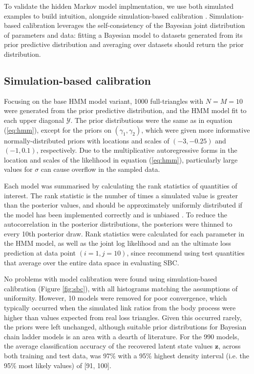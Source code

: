To validate the hidden Markov model implmentation, 
we use both simulated examples
to build intuition, alongside
simulation-based calibration \citep{talts2018,modrak2023}.
Simulation-based calibration leverages the self-consistency
of the Bayesian joint distribution of parameters and
data: fitting a Bayesian model to datasets generated
from its prior predictive distribution and averaging 
over datasets should return the prior distribution.

\subsection{Simulation-based calibration}
Focusing on the base HMM model variant, 1000 
full-triangles with $N = M = 10$ were generated
from the prior predictive distribution, and the
HMM model fit to each upper diagonal $\mathcal{Y}$.
The prior distributions were the same as in
equation (\ref{eq:hmm}), except for the priors
on $(\gamma_{1}, \gamma_{2})$, which were 
given more informative normally-distributed priors
with locations and scales of $(-3, -0.25)$ and
$(-1, 0.1)$, respectively. Due to the
multiplicative autoregressive forms in the
location and scales of the likelihood in
equation (\ref{eq:hmm}), particularly
large values for $\sigma$ can cause overflow
in the sampled data.

Each model was summarised by
calculating the rank statistics of quantities
of interest.
The rank statistic is the number of times a
simulated value is greater than the posterior values,
and should be approximately uniformly distributed
if the model has been implemented correctly and is
unbiased \citep{talts2018}. To reduce the autocorrelation
in the posterior distributions, the posteriors were
thinned to every 10th posterior draw.
Rank statistics
were calculated for each parameter in the HMM model,
as well as the joint log likelihood and
an the ultimate loss prediction at data point
$(i=1, j=10)$, since \cite{modrak2023} recommend
using test quantities that average over the entire
data space in evaluating SBC.

No problems with model calibration were found using simulation-based
calibration (Figure \ref{fig:sbc}),
with all histograms matching the assumptions of
uniformity. However, 10 models were removed for poor
convergence, which typically occurred when the simulated
link ratios from the body process were
higher than values expected from real loss triangles. 
Given this occurred rarely, the priors were left
unchanged, although suitable prior distributions
for Bayesian chain ladder models is an area
with a dearth of literature.
For the 990 models, 
the average classification accuracy of the recovered latent
state values $\bm{z}$, across
both training and test data, was 97\% with a 
95\% highest density interval (i.e. the 95\% most
likely values) of [91, 100].

